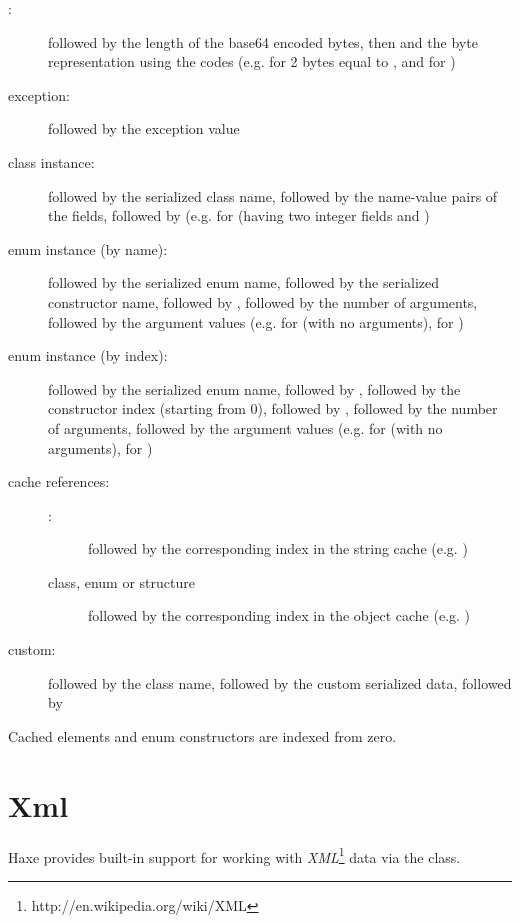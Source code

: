 \begin{description}
	\item[:]  followed by the length of the base64 encoded bytes, then \expr{:} and the byte representation using the codes  (e.g.  for 2 bytes equal to , and  for )
	\item[exception:]  followed by the exception value
	\item[class instance:]  followed by the serialized class name, followed by the name-value pairs of the fields, followed by  (e.g.  for  (having two integer fields  and )
        \item[enum instance (by name):]  followed by the serialized enum name, followed by the serialized constructor name, followed by \expr{:}, followed by the number of arguments, followed by the argument values (e.g.  for  (with no arguments),  for )
	\item[enum instance (by index):]  followed by the serialized enum name, followed by \expr{:}, followed by the constructor index (starting from 0), followed by \expr{:}, followed by the number of arguments, followed by the argument values (e.g.  for  (with no arguments),  for )
	\item[cache references:] \mbox{}
		\begin{description}
			\item[:]  followed by the corresponding index in the string cache (e.g. )
			\item[class, enum or structure]  followed by the corresponding index in the object cache (e.g. )
		\end{description}
	\item[custom:]  followed by the class name, followed by the custom serialized data, followed by 
\end{description}

\noindent Cached elements and enum constructors are indexed from zero.

\section{Xml}
\label{std-Xml}

Haxe provides built-in support for working with \emph{XML}\footnote{http://en.wikipedia.org/wiki/XML} data via the  class. 

